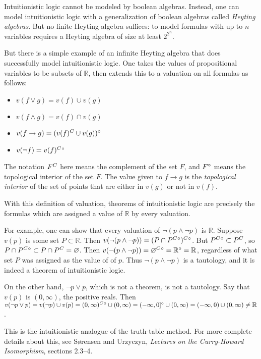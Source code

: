 \documentclass{article}
\def\R{{\mathbb R}}
\def\comp#1{\smash{#1}^C\vphantom{#1}}
\def\inter#1{\smash{#1}^\circ\vphantom{#1}}
\def\intercomp#1{\inter{\comp{#1}}}
\def\imp{\rightarrow}           %
\begin{document}
Intuitionistic logic cannot be modeled by boolean algebras.  Instead,
one can model intuitionistic logic with a generalization of boolean
algebras called {\em Heyting algebras\/}.  But no finite Heyting
algebra suffices: to model formulas with up to $n$ variables requires
a Heyting algebra of size at least $2^{2^n}$.

But there is a simple example of an infinite Heyting algebra that does
successfully model intuitionistic logic.  One takes the values of
propositional variables to be subsets of $\R$, then extends this to a
valuation on all formulas as follows:

\begin{itemize}
\item$ v(f\vee g) = v(f)\cup v(g)$
\item$ v(f\wedge g) = v(f)\cap v(g)$
\item$ v(f\imp g) = \inter{(\comp{v(f)} \cup v(g))}$
\item$ v(\neg f) = \intercomp{v(f)}$
\end{itemize}

The notation $\comp{F}$ here means the complement of the set
$F$, and $\inter{F}$ means the topological interior of the
set $F$.
The value given to
$f\imp g$ is the {\em topological interior\/} of the set of points
that are  either in $v(g)$ or not in $v(f)$.  

With this definition of valuation, theorems of intuitionistic logic
are precisely the formulas which are assigned a value of $\R$ by every
valuation. 

For example, one can show that every valuation of $\neg(p\wedge\neg
p)$ is $\R$.  Suppose $v(p)$ is some set $P\subset\R$.  Then
$v(\neg(p\wedge\neg p)) = \intercomp{(P\cap\intercomp P)}$.  But
$\intercomp P \subset \comp P$, so $P\cap\intercomp P \subset
P\cap\comp P = \varnothing$.  Then $v(\neg(p\wedge\neg p)) =
\intercomp\varnothing = \inter\R = \R$, regardless of what set $P$ was
assigned as the value of of $p$.  Thus $\neg(p\wedge\neg p)$ is a
tautology, and it is indeed a theorem of intuitionistic logic.

On the other hand, $\neg p\vee p$, which is not a theorem, is not a tautology.
Say that $v(p)$ is $(0, \infty)$, the positive reals.  Then $v(\neg p\vee p)
= v(\neg p) \cup v(p)
= \intercomp{(0, \infty)} \cup (0, \infty)
= \inter{(-\infty, 0]}    \cup (0, \infty) 
= (-\infty, 0)            \cup (0, \infty)
\ne\R$.

This is the intuitionistic analogue of the truth-table method. For
more complete details about this, see S\o rensen and Urzyczyn,
{\em Lectures on the Curry-Howard Isomorphism\/}, sections 2.3--4.
\end{document}

